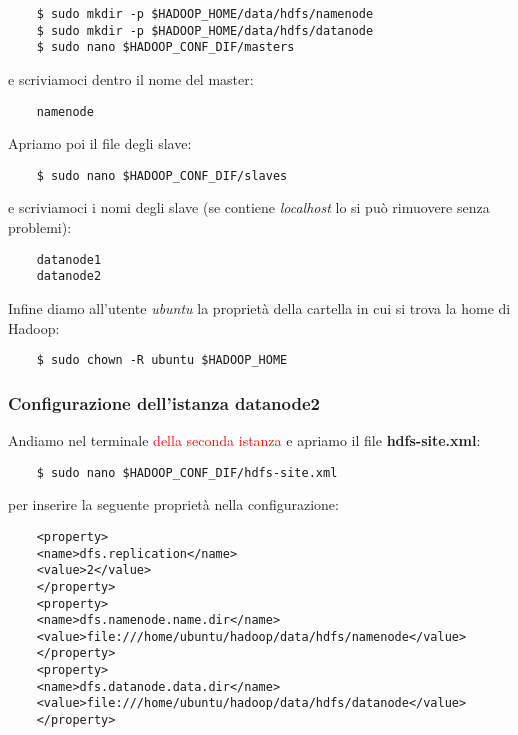 \begin{verbatim}
    $ sudo mkdir -p $HADOOP_HOME/data/hdfs/namenode
    $ sudo mkdir -p $HADOOP_HOME/data/hdfs/datanode
    $ sudo nano $HADOOP_CONF_DIF/masters
\end{verbatim}

e scriviamoci dentro il nome del master:

\begin{verbatim}
    namenode
\end{verbatim}

Apriamo poi il file degli slave:

\begin{verbatim}
    $ sudo nano $HADOOP_CONF_DIF/slaves
\end{verbatim}

e scriviamoci i nomi degli slave (se contiene \textit{localhost} lo si può rimuovere senza problemi):

\begin{verbatim}
    datanode1
    datanode2
\end{verbatim}

Infine diamo all'utente \textit{ubuntu} la proprietà della cartella in cui si trova la home di Hadoop:

\begin{verbatim}
    $ sudo chown -R ubuntu $HADOOP_HOME
\end{verbatim}



\subsubsection{Configurazione dell'istanza datanode2}

Andiamo nel terminale \textcolor{red}{della seconda istanza} e apriamo il file \textbf{hdfs-site.xml}:

\begin{verbatim}
    $ sudo nano $HADOOP_CONF_DIF/hdfs-site.xml
\end{verbatim}

per inserire la seguente proprietà nella configurazione:

\begin{verbatim}
    <property>
    <name>dfs.replication</name>
    <value>2</value>
    </property>
    <property>
    <name>dfs.namenode.name.dir</name>
    <value>file:///home/ubuntu/hadoop/data/hdfs/namenode</value>
    </property>
    <property>
    <name>dfs.datanode.data.dir</name>
    <value>file:///home/ubuntu/hadoop/data/hdfs/datanode</value>
    </property>
\end{verbatim}

